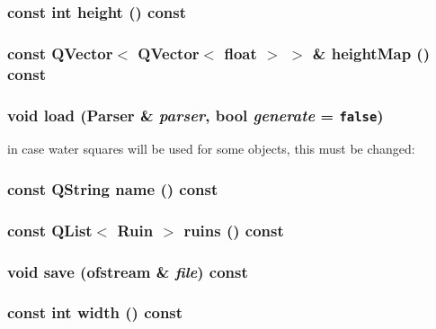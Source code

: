 \subsubsection{\setlength{\rightskip}{0pt plus 5cm}const int height () const}\label{classWorld_a8}


\subsubsection{\setlength{\rightskip}{0pt plus 5cm}const QVector$<$ QVector$<$ float $>$ $>$ \& height\-Map () const}\label{classWorld_a4}


\subsubsection{\setlength{\rightskip}{0pt plus 5cm}void load ({\bf Parser} \& {\em parser}, bool {\em generate} = {\tt false})}\label{classWorld_a2}


in case water squares will be used for some objects, this must be changed: 
\subsubsection{\setlength{\rightskip}{0pt plus 5cm}const QString name () const}\label{classWorld_a6}


\subsubsection{\setlength{\rightskip}{0pt plus 5cm}const QList$<$ {\bf Ruin} $>$ ruins () const}\label{classWorld_a5}


\subsubsection{\setlength{\rightskip}{0pt plus 5cm}void save (ofstream \& {\em file}) const}\label{classWorld_a3}


\subsubsection{\setlength{\rightskip}{0pt plus 5cm}const int width () const}\label{classWorld_a7}




